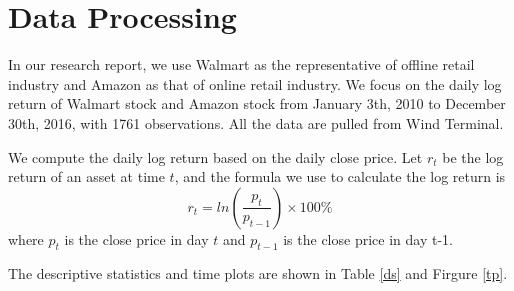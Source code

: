 \documentclass[paper=a4, fontsize=13pt]{article}
\begin{document}
\section{Data Processing}
In our research report, we use Walmart as the representative of offline retail industry and Amazon as that of online retail industry. We focus on the daily log return of Walmart stock and Amazon stock from January 3th, 2010 to December 30th, 2016, with 1761 observations. All the data are pulled from Wind Terminal.

We compute the daily log return based on the  daily close price. Let $r_t$ be the log return of an asset at time $t$, and the formula we use to calculate the log return is
\[ r_t = ln(\frac{p_t}{p_{t-1}}) \times 100\% \]
where $p_t$ is the close price in day $t$ and $p_{t-1}$ is the close price in day {t-1}.

The descriptive statistics and time plots are shown in Table \ref{ds} and Firgure \ref{tp}.

\begin{table}[!htbp]
\caption{Descriptive Statistics}  
\centering  
{}  
\qquad  
{}
\label{ds} 
\end{table}  
\end{document}
